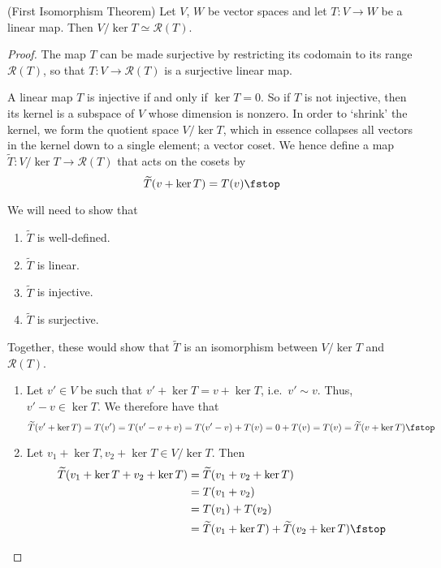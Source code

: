   \begin{theorem}
   (First Isomorphism Theorem) Let \( V \), \( W \) be vector spaces and let \( T:V\to W \) be a linear map. Then \( V/\ker T\simeq\mathcal{R}(T) \).
 \end{theorem}
 \begin{proof}
   The map \( T \) can be made surjective by restricting its codomain to its range \( \mathcal{R}(T) \), so that \( T:V\to\mathcal{R}(T) \) is a surjective linear map.

   \vspace{3mm}

   A linear map \( T \) is injective if and only if \( \ker T=\qty{0} \). So if \( T \) is not injective, then its kernel is a subspace of \( V \) whose dimension is nonzero. In order to `shrink' the kernel, we form the quotient space \( V/\ker T \), which in essence collapses all vectors in the kernel down to a single element; a vector coset. We hence define a map \( \widetilde{T}:V/\ker T\to\mathcal{R}(T) \) that acts on the cosets by
   \[ \widetilde{T}(v+\ker T)=T(v)\fstop \]

   We will need to show that
   \begin{enumerate}[label=(\roman*)]
   \item \( \widetilde{T} \) is well-defined.
   \item \( \widetilde{T} \) is linear.
   \item \( \widetilde{T} \) is injective.
   \item \( \widetilde{T} \) is surjective.
   \end{enumerate}

   Together, these would show that \( \widetilde{T} \) is an isomorphism between \( V/\ker T \) and \( \mathcal{R}(T) \).
   \begin{enumerate}[label=(\roman*)]
   \item Let \( v'\in V \) be such that \( v'+\ker T=v+\ker T \), i.e.\ \( v'\sim v \). Thus, \( v'-v\in\ker T \). We therefore have that
     \[ \widetilde{T}(v'+\ker T)=T(v')=T(v'-v+v)=T(v'-v)+T(v)=0+T(v)=T(v)=\widetilde{T}(v+\ker T)\fstop \]
   \item Let \( v_1+\ker T, v_2+\ker T\in V/\ker T \). Then
     \begin{align*}
       \widetilde{T}(v_1+\ker T+v_2+\ker T)&= \widetilde{T}(v_1+v_2+\ker T)\\
       &= T(v_1+v_2)\\
       &= T(v_1)+T(v_2)\\
       &= \widetilde{T}(v_1+\ker T)+\widetilde{T}(v_2+\ker T)\fstop
     \end{align*}


\end{enumerate}
\end{proof}
